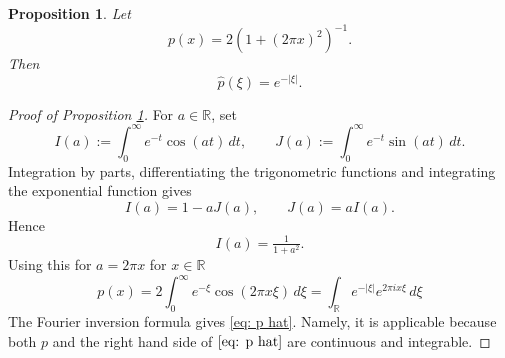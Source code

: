 \documentclass[12pt,reqno]{amsart}
\theoremstyle{plain}
\newtheorem{proposition}[theorem]{Proposition}
\numberwithin{equation}{section}
\theoremstyle{remark}
\newcommand{\R}{{\mathbb R}}
\begin{document}
\begin{proposition}\label{poisson to abel}
Let
\begin{equation}\label{auto:Gaussian-comparison-function}
    p(x)=2(1+(2\pi x)^2)^{-1}.
\end{equation}
Then
\begin{equation}\label{eq: p hat}
    \widehat{p}(\xi)=e^{- |\xi|}.
\end{equation}
\end{proposition}
\begin{proof}[Proof of Proposition \ref{poisson to abel}]
For \(a\in\R\), set
\[
    I(a):=\int_0^\infty e^{-t}\cos(at)\,dt,
    \qquad
    J(a):=\int_0^\infty e^{-t}\sin(at)\,dt.
\]
Integration by parts, differentiating the trigonometric functions and integrating the exponential function gives
\[
    I(a)=1-aJ(a),
    \qquad
    J(a)=aI(a).
\]
Hence
\[
    I(a)=\tfrac{1}{1+a^2}.
\]
Using this for $a=2\pi x$ for \(x\in\R\)
\begin{equation}
    p(x)=2\int_0^\infty e^{-\xi}\cos(2\pi x\xi)\,d\xi  =\int_{\R}e^{-|\xi|}e^{2\pi i x\xi}\,d\xi
\end{equation}
 The Fourier inversion formula gives \eqref{eq: p hat}. Namely, it is applicable because
 both $p$ and the right hand side of $\eqref{eq: p hat}$ are continuous and integrable.

\end{proof}
\end{document}
